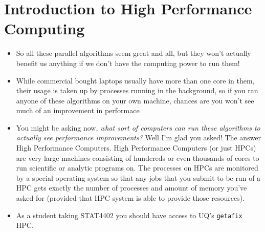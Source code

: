 \section{Introduction to High Performance Computing}

\begin{itemize}
    \item So all these parallel algorithms seem great and all, but they won't actually benefit us anything if we don't have the computing power to run them!
    \item While commercial bought laptops usually have more than one core in them, their usage is taken up by processes running in the background, so if you ran anyone of these algorithms on your own machine, chances are you won't see much of an improvement in performace
    \item You might be asking now, {\it what sort of computers can run these algorithms to actually see performance improvements?} Well I'm glad you asked! The answer {High Performance Computers}. High Performance Computers (or just HPCs) are very large machines consisting of hundereds or even thousands of cores to run scientific or analytic programs on. The processes on HPCs are monitored by a special operating system so that any jobs that you submit to be run of a HPC gets exactly the number of processes and amount of memory you've asked for (provided that HPC system is able to provide those resources).
    \item As a student taking STAT4402 you should have access to UQ's \texttt{getafix} HPC.
\end{itemize}